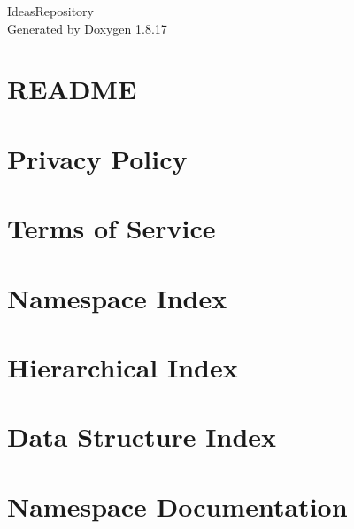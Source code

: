 \let\mypdfximage\pdfximage\def\pdfximage{\immediate\mypdfximage}\documentclass[twoside]{book}
\newcommand{\+}{\discretionary{\mbox{\scriptsize$\hookleftarrow$}}{}{}}
\newcommand{\clearemptydoublepage}{%
  \newpage{\pagestyle{empty}\cleardoublepage}%
}
\begin{document}
\hypersetup{pageanchor=false,
             bookmarksnumbered=true,
             pdfencoding=unicode
            }
\begin{titlepage}
\vspace*{7cm}
\begin{center}%
{\Large Ideas\+Repository }\\
\vspace*{1cm}
{\large Generated by Doxygen 1.8.17}\\
\end{center}
\end{titlepage}
\clearemptydoublepage
{}
\tableofcontents
\clearemptydoublepage
{}
\hypersetup{pageanchor=true}

\chapter{R\+E\+A\+D\+ME}
\label{md__ideas_repository__r_e_a_d_m_e}

\chapter{Privacy Policy}
\label{md__ideas_repository_resources_markdown_policy}

\chapter{Terms of Service}
\label{md__ideas_repository_resources_markdown_terms}

\chapter{Namespace Index}

\chapter{Hierarchical Index}

\chapter{Data Structure Index}

\chapter{Namespace Documentation}

\end{document}
